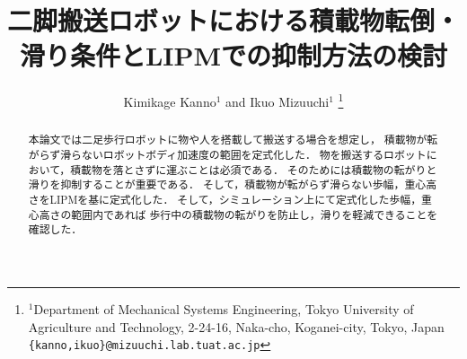 \documentclass[letterpaper, 10 pt, conference,dvipdfmx]{ieeeconf}  %
\title{\LARGE \bf
二脚搬送ロボットにおける積載物転倒・滑り条件とLIPMでの抑制方法の検討
}
\author{Kimikage Kanno$^{1}$ and Ikuo Mizuuchi$^{1}$%
\thanks{$^{1}$Department of Mechanical Systems Engineering, Tokyo University of Agriculture and Technology, 2-24-16, Naka-cho, Koganei-city, Tokyo, Japan
        {\tt\small \{kanno,ikuo\}@mizuuchi.lab.tuat.ac.jp}}%
}
\begin{document}
\maketitle
\thispagestyle{empty}
\pagestyle{empty}


\begin{abstract} 
本論文では二足歩行ロボットに物や人を搭載して搬送する場合を想定し，
積載物が転がらず滑らないロボットボディ加速度の範囲を定式化した．
物を搬送するロボットにおいて，積載物を落とさずに運ぶことは必須である．
そのためには積載物の転がりと滑りを抑制することが重要である．
そして，積載物が転がらず滑らない歩幅，重心高さをLIPMを基に定式化した．
そして，シミュレーション上にて定式化した歩幅，重心高さの範囲内であれば
歩行中の積載物の転がりを防止し，滑りを軽減できることを確認した．\\        
\end{abstract}





% 
% 



\end{document}
